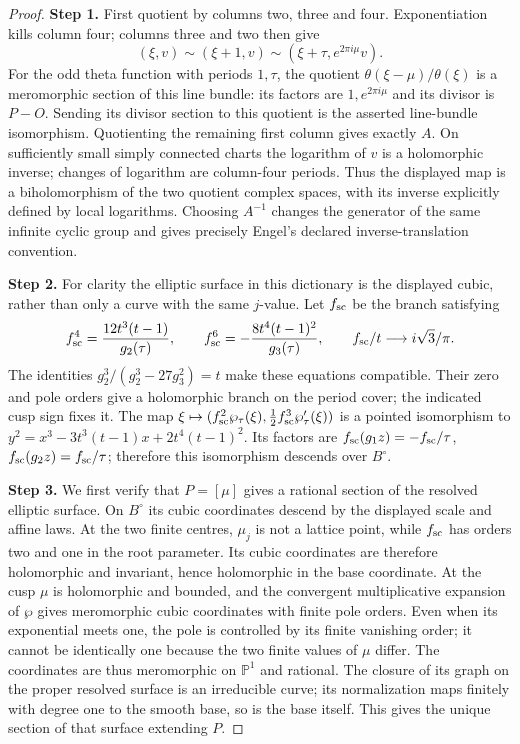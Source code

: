 \begin{proof}
\par\smallskip\noindent\textbf{Step 1.} First quotient by columns two, three and four. Exponentiation kills column four; columns three and two then give
\[
 (\xi,v)\sim(\xi+1,v)\sim(\xi+\tau,e^{2\pi i\mu}v).
\]
For the odd theta function with periods $1,\tau$, the quotient $\theta(\xi-\mu)/\theta(\xi)$ is a meromorphic section of this line bundle: its factors are $1,e^{2\pi i\mu}$ and its divisor is $P-O$. Sending its divisor section to this quotient is the asserted line-bundle isomorphism. Quotienting the remaining first column gives exactly $A$. On sufficiently small simply connected charts the logarithm of $v$ is a holomorphic inverse; changes of logarithm are column-four periods. Thus the displayed map is a biholomorphism of the two quotient complex spaces, with its inverse explicitly defined by local logarithms. Choosing $A^{-1}$ changes the generator of the same infinite cyclic group and gives precisely Engel's declared inverse-translation convention.

\par\smallskip\noindent\textbf{Step 2.} For clarity the elliptic surface in this dictionary is the displayed cubic, rather than only a curve with the same $j$-value. Let $f_{\rm sc}$ be the branch satisfying
\[
 f_{\rm sc}^4=\frac{12t^3(t-1)}{g_2(\tau)},\qquad
 f_{\rm sc}^6=-\frac{8t^4(t-1)^2}{g_3(\tau)},\qquad
 f_{\rm sc}/t\longrightarrow i\sqrt3/\pi.
\]
The identities $g_2^3/(g_2^3-27g_3^2)=t$ make these equations compatible. Their zero and pole orders give a holomorphic branch on the period cover; the indicated cusp sign fixes it. The map $\xi\mapsto(f_{\rm sc}^2\wp_\tau(\xi),\frac12f_{\rm sc}^3\wp'_\tau(\xi))$ is a pointed isomorphism to
$y^2=x^3-3t^3(t-1)x+2t^4(t-1)^2$. Its factors are $f_{\rm sc}(g_1z)=-f_{\rm sc}/\tau$, $f_{\rm sc}(g_2z)=f_{\rm sc}/\tau$; therefore this isomorphism descends over $B^\circ$.

\par\smallskip\noindent\textbf{Step 3.} We first verify that $P=[\mu]$ gives a rational section of the resolved elliptic surface. On $B^\circ$ its cubic coordinates descend by the displayed scale and affine laws. At the two finite centres, $\mu_j$ is not a lattice point, while $f_{\rm sc}$ has orders two and one in the root parameter. Its cubic coordinates are therefore holomorphic and invariant, hence holomorphic in the base coordinate. At the cusp $\mu$ is holomorphic and bounded, and the convergent multiplicative expansion of $\wp$ gives meromorphic cubic coordinates with finite pole orders. Even when its exponential meets one, the pole is controlled by its finite vanishing order; it cannot be identically one because the two finite values of $\mu$ differ. The coordinates are thus meromorphic on $\mathbb P^1$ and rational. The closure of its graph on the proper resolved surface is an irreducible curve; its normalization maps finitely with degree one to the smooth base, so is the base itself. This gives the unique section of that surface extending $P$.


\end{proof}
